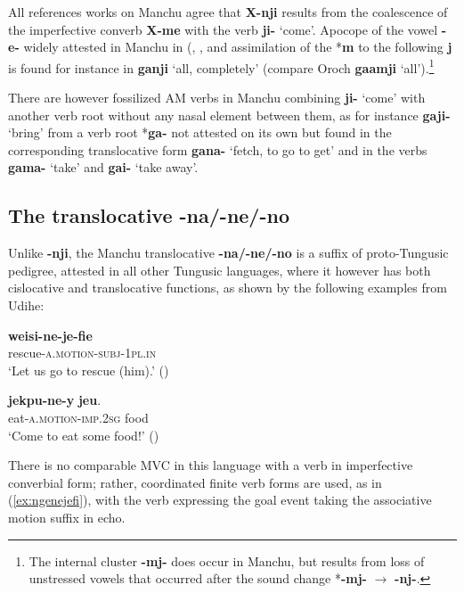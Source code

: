 \documentclass{article}
\newcommand{\ipa}[1]{\textbf{{\phon\mbox{#1}}}} %
\begin{document}
All references works on Manchu agree that \ipa{X-nji} results from the coalescence of the imperfective converb \ipa{X-me} with the verb \ipa{ji-} `come'. Apocope of the vowel \ipa{-e-} widely attested in Manchu in (\citealt[18-19]{hattori56manchu}, \citet[43-44]{gorelova02manchu}, and assimilation of the *\ipa{m} to the following \ipa{j} is found for instance in \ipa{ganji} `all, completely' (compare Oroch \ipa{gaamji} `all').\footnote{The internal cluster \ipa{-mj-} does occur in Manchu, but results from loss of unstressed vowels that occurred after the sound change *\ipa{-mj-} $\rightarrow$ \ipa{-nj-}. }


There are however fossilized AM verbs in Manchu combining \ipa{ji-} `come' with another verb root without any nasal element between them, as for instance \ipa{gaji-} `bring' from a verb root *\ipa{ga-} not attested on its own but found in the corresponding translocative form \ipa{gana-} `fetch, to go to get' and in the verbs \ipa{gama-} `take' and  \ipa{gai-} `take away'. 


\subsection{The translocative \ipa{-na/-ne/-no} } \label{sec:translocative}
Unlike \ipa{-nji}, the Manchu translocative \ipa{-na/-ne/-no} is a suffix of proto-Tungusic pedigree, attested in all other Tungusic languages, where it however has both cislocative and translocative functions, as shown by the following examples from Udihe:

\begin{exe}
\ex 
\gll \ipa{weisi-ne-je-fie} \\
rescue-\textsc{a.motion-subj-1pl.in} \\
\glt ‘Let us go to rescue (him).’ (\citealt[47]{nikolaeva01udihe})
\end{exe}

\begin{exe}
\ex 
\gll \ipa{jekpu-ne-y} \ipa{jeu}. \\
eat-\textsc{a.motion-imp.2sg} food \\
\glt ‘Come to eat some food!’ (\citealt[122]{nikolaeva01udihe})
\end{exe}

There is no comparable MVC in this language with a verb in imperfective converbial form; rather, coordinated finite verb forms are used, as in (\ref{ex:ngenejefi}), with the verb expressing the goal event taking the associative motion suffix in echo.
\end{document}
